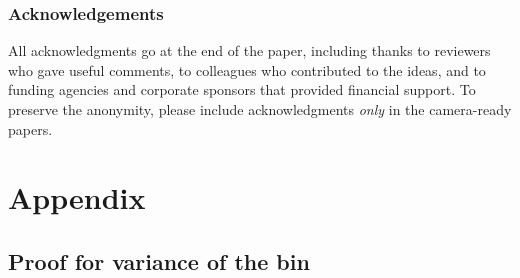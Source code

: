 \documentclass[twoside]{article}
\begin{document}
\subsubsection*{Acknowledgements}
All acknowledgments go at the end of the paper, including thanks to reviewers who gave useful comments, to colleagues who contributed to the ideas, and to funding agencies and corporate sponsors that provided financial support. 
To preserve the anonymity, please include acknowledgments \emph{only} in the camera-ready papers.




\section*{Appendix}

\subsection{Proof for variance of the bin}
\end{document}
